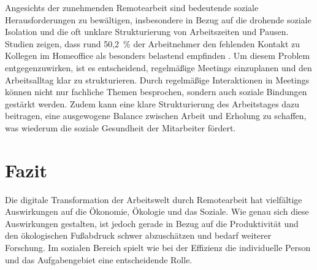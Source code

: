 \documentclass[runningheads]{llncs}
\begin{document}
Angesichts der zunehmenden Remotearbeit sind bedeutende soziale Herausforderungen zu bewältigen, insbesondere in Bezug auf die drohende soziale Isolation und die oft unklare Strukturierung von Arbeitszeiten und Pausen. Studien zeigen, dass rund 50,2~\% der Arbeitnehmer den fehlenden Kontakt zu Kollegen im Homeoffice als besonders belastend empfinden \cite{statista_belastende_2021}.
Um diesem Problem entgegenzuwirken, ist es entscheidend, regelmäßige Meetings einzuplanen und den Arbeitsalltag klar zu strukturieren. Durch regelmäßige Interaktionen in Meetings können nicht nur fachliche Themen besprochen, sondern auch soziale Bindungen gestärkt werden. Zudem kann eine klare Strukturierung des Arbeitstages dazu beitragen, eine ausgewogene Balance zwischen Arbeit und Erholung zu schaffen, was wiederum die soziale Gesundheit der Mitarbeiter fördert. \cite{schneider_homeoffice_2022}

\section{Fazit}

Die digitale Transformation der Arbeitswelt durch Remotearbeit hat vielfältige Auswirkungen auf die Ökonomie, Ökologie und das Soziale.
Wie genau sich diese Auswirkungen gestalten, ist jedoch gerade in Bezug auf die Produktivität und den ökologischen Fußabdruck schwer abzuschätzen und bedarf weiterer Forschung.
Im sozialen Bereich spielt wie bei der Effizienz die individuelle Person und das Aufgabengebiet eine entscheidende Rolle.




\end{document}
